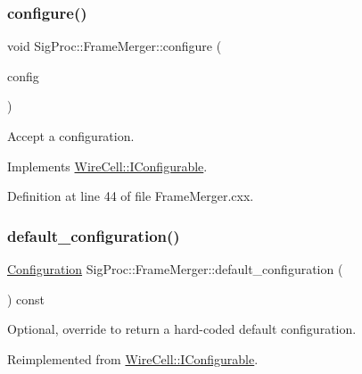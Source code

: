 \subsubsection{\texorpdfstring{configure()}{configure()}}
{\footnotesize\ttfamily void Sig\+Proc\+::\+Frame\+Merger\+::configure (\begin{DoxyParamCaption}\item[{const \hyperlink{namespace_wire_cell_a9f705541fc1d46c608b3d32c182333ee}{Wire\+Cell\+::\+Configuration} \&}]{config }\end{DoxyParamCaption})\hspace{0.3cm}{\ttfamily [virtual]}}



Accept a configuration. 



Implements \hyperlink{class_wire_cell_1_1_i_configurable_a57ff687923a724093df3de59c6ff237d}{Wire\+Cell\+::\+I\+Configurable}.



Definition at line 44 of file Frame\+Merger.\+cxx.

\mbox{\label{class_wire_cell_1_1_sig_proc_1_1_frame_merger_a338f9c397a378eeae1ae2ac93cfca07d}} 
\subsubsection{\texorpdfstring{default\+\_\+configuration()}{default\_configuration()}}
{\footnotesize\ttfamily \hyperlink{namespace_wire_cell_a9f705541fc1d46c608b3d32c182333ee}{Configuration} Sig\+Proc\+::\+Frame\+Merger\+::default\+\_\+configuration (\begin{DoxyParamCaption}{ }\end{DoxyParamCaption}) const\hspace{0.3cm}{\ttfamily [virtual]}}



Optional, override to return a hard-\/coded default configuration. 



Reimplemented from \hyperlink{class_wire_cell_1_1_i_configurable_a54841b2da3d1ea02189478bff96f7998}{Wire\+Cell\+::\+I\+Configurable}.



